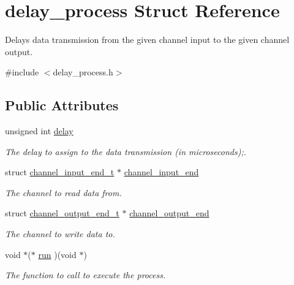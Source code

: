 \hypertarget{structdelay__process}{\section{delay\-\_\-process Struct Reference}
\label{structdelay__process}
}


Delays data transmission from the given channel input to the given channel output.  




{\ttfamily \#include $<$delay\-\_\-process.\-h$>$}

\subsection*{Public Attributes}
\begin{DoxyCompactItemize}
\item 
\hypertarget{structdelay__process_a66f20e8d528fb97c0f0cde25108e6f0e}{unsigned int \hyperlink{structdelay__process_a66f20e8d528fb97c0f0cde25108e6f0e}{delay}}\label{structdelay__process_a66f20e8d528fb97c0f0cde25108e6f0e}

\begin{DoxyCompactList}\small\item\em The delay to assign to the data transmission (in microseconds);. \end{DoxyCompactList}\item 
\hypertarget{structdelay__process_a11a263b2389c39129372f143123eb79d}{struct \hyperlink{structchannel__input__end__t}{channel\-\_\-input\-\_\-end\-\_\-t} $\ast$ \hyperlink{structdelay__process_a11a263b2389c39129372f143123eb79d}{channel\-\_\-input\-\_\-end}}\label{structdelay__process_a11a263b2389c39129372f143123eb79d}

\begin{DoxyCompactList}\small\item\em The channel to read data from. \end{DoxyCompactList}\item 
\hypertarget{structdelay__process_a6a7bb9f06e179157cf7ba10e0f5a2e93}{struct \hyperlink{structchannel__output__end__t}{channel\-\_\-output\-\_\-end\-\_\-t} $\ast$ \hyperlink{structdelay__process_a6a7bb9f06e179157cf7ba10e0f5a2e93}{channel\-\_\-output\-\_\-end}}\label{structdelay__process_a6a7bb9f06e179157cf7ba10e0f5a2e93}

\begin{DoxyCompactList}\small\item\em The channel to write data to. \end{DoxyCompactList}\item 
\hypertarget{structdelay__process_a3f571ea29b9817b258af799acf206de8}{void $\ast$($\ast$ \hyperlink{structdelay__process_a3f571ea29b9817b258af799acf206de8}{run} )(void $\ast$)}\label{structdelay__process_a3f571ea29b9817b258af799acf206de8}

\begin{DoxyCompactList}\small\item\em The function to call to execute the process. \end{DoxyCompactList}\end{DoxyCompactItemize}


